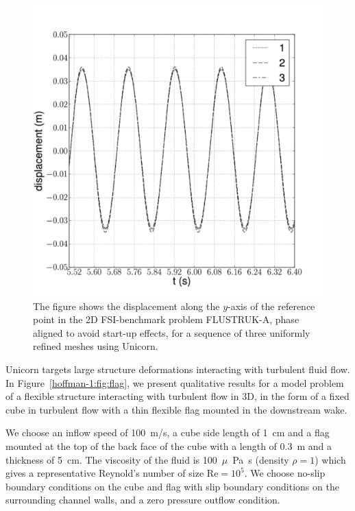 \begin{figure}
  \centering
  \includegraphics[width=\largefig]{chapters/hoffman-1/png/fsi_bench3D_displacement_aligned.pdf}
  \caption{The figure shows the displacement along the $y$-axis of the
    reference point in the 2D FSI-benchmark problem FLUSTRUK-A, phase
    aligned to avoid start-up effects, for a sequence of three
    uniformly refined meshes using Unicorn.}
  \label{hoffman-1:fig:flustruk}
\end{figure}

Unicorn targets large structure deformations interacting with turbulent
fluid flow. In Figure~\ref{hoffman-1:fig:flag}, we present qualitative results for
a model problem of a flexible structure interacting with turbulent flow
in 3D, in the form of a fixed cube in turbulent flow with a thin flexible
flag mounted in the downstream wake.

We choose an inflow speed of 100~m/s, a cube side length of 1~cm and a
flag mounted at the top of the back face of the cube with a length of
0.3~m and a thickness of 5~cm. The viscosity of the fluid is
100~$\mu$~Pa~s (density $\rho=1$) which gives a representative
Reynold's number of size $\mathrm{Re} = 10^5$. We choose no-slip
boundary conditions on the cube and flag with slip boundary conditions
on the surrounding channel walls, and a zero pressure outflow
condition.

